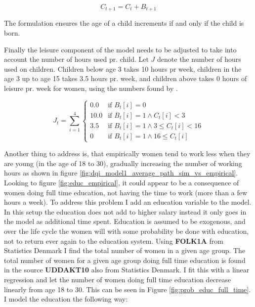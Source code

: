\begin{equation}
    C_{t+1} = C_t + B_{t+1}
\end{equation}

The formulation ensures the age of a child increments if and only if the child is born.

Finally the leisure component of the model needs to be adjusted to take into account the number of hours used pr. child. Let $J$ denote the number of hours used on children. Children below age 3 takes 10 hours pr week, children in the age 3 up to age 15 takes 3.5 hours pr. week, and children above takes 0 hours of leisure pr. week for women,  using the numbers found by \textcite{ekert-jaffe_time_2015}. 

\begin{equation}
    J_t = \sum_{i=1}^4 \begin{cases}
        0.0 & \text{if } B_t[i] = 0 \\
        10.0 & \text{if } B_t[i] = 1 \land C_t[i] < 3 \\
        3.5 & \text{if } B_t[i] = 1 \land 3 \leq C_t[i] < 16 \\
        0 & \text{if } B_t[i] = 1 \land  16 \leq  C_t[i] 
    \end{cases}
\end{equation}

Another thing to address is, that empirically women tend to work less when they are young (in the age of 18 to 30), gradually increasing the number of working hours as shown in figure \ref{fig:dqi_model1_average_path_sim_vs_empirical}.  Looking to figure \ref{fig:educ_empirical}, it could appear to be a consequence of women doing full time education, not having the time to work (more than a few hours a week). To address this problem I add an education variable to the model. In this setup the education does not add to higher salary instead it only goes in the model as additional time spent. Education is assumed to be exogenous, and over the life cycle the women will with some probability be done with education, not to return ever again to the education system. Using \textbf{FOLK1A} from Statistics Denmark I find the total number of women in a given age group. The total number of women for a given age group doing full time education is found in the source \textbf{UDDAKT10} also from Statistics Denmark. I fit this with a linear regression and let the number of women doing full time education decrease linearly from age 18 to 30. This can be seen in Figure \ref{fig:prob_educ_full_time}. I model the education the following way:

